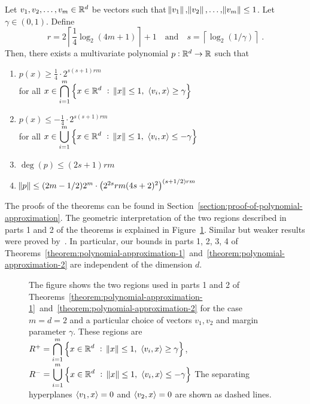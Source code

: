 \begin{theorem}
\label{theorem:polynomial-approximation-2}
Let $v_1, v_2, \dots, v_m \in \mathbb{R}^d$ be vectors such that $\norm{v_1},
\norm{v_2}, \dots, \norm{v_m} \le 1$. Let $\gamma \in (0,1)$.
Define
$$
r = 2 \left\lceil \frac{1}{4} \log_2(4m + 1) \right\rceil + 1 \quad \text{and} \quad s = \left \lceil \log_2(1/\gamma) \right \rceil \; .
$$
Then, there exists a multivariate polynomial $p:\mathbb{R}^d \to \mathbb{R}$ such that
\begin{enumerate}
\item $\displaystyle p(x) \ge \frac{1}{4} \cdot 2^{s(s+1)rm}$ \\
for all $\displaystyle x \in \bigcap_{i=1}^m \left\{ x \in \mathbb{R}^d ~:~ \norm{x} \le 1, \ \left\langle v_i, x \right\rangle \ge \gamma \right\}$

\item $\displaystyle p(x) \le - \frac{1}{4} \cdot 2^{s(s+1)rm}$ \\
for all $\displaystyle x \in \bigcup_{i=1}^m \left\{ x \in \mathbb{R}^d ~:~ \norm{x} \le 1, \ \left\langle v_i, x \right\rangle \le - \gamma \right\}$

\item $\deg(p) \le (2s+1) rm$
\item $\norm{p} \le (2m-1/2) 2^m \cdot \left(2^{2s} rm (4s+2)^2 \right)^{(s+1/2)rm}$
\end{enumerate}
\end{theorem}

The proofs of the theorems can be found in
Section~\ref{section:proof-of-polynomial-approximation}. The geometric
interpretation of the two regions described in parts 1 and 2 of the theorems is
explained in Figure~\ref{figure:pizza-slice}. Similar but weaker results were
proved by~\citet{Klivans-Servedio-2008}. In particular, our bounds in parts 1,
2, 3, 4 of
Theorems~\ref{theorem:polynomial-approximation-1}~and~\ref{theorem:polynomial-approximation-2}
are independent of the dimension $d$.

\begin{figure}
\begin{center}

\end{center}
\caption[]{The figure shows the two regions used in parts 1 and 2 of
Theorems~\ref{theorem:polynomial-approximation-1}~and~\ref{theorem:polynomial-approximation-2}
for the case $m=d=2$ and a particular choice of vectors $v_1, v_2$ and margin
parameter $\gamma$. These regions are
$R^+ = \displaystyle \bigcap_{i=1}^m \left\{ x \in \mathbb{R}^d ~:~ \norm{x} \le 1, \ \left\langle v_i, x \right\rangle \ge \gamma \right\}$,
$R^- = \displaystyle \bigcup_{i=1}^m \left\{ x \in \mathbb{R}^d ~:~ \norm{x} \le 1, \ \left\langle v_i, x \right\rangle \le - \gamma \right\}$
The separating hyperplanes $\left\langle v_1, x \right\rangle = 0$ and $\left\langle v_2, x \right\rangle = 0$ are shown as dashed lines.}
\label{figure:pizza-slice}
\end{figure}

